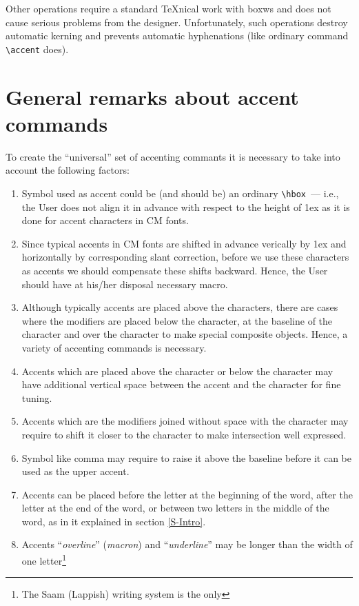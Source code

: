 Other operations require a standard \TeX{}nical work
with boxws and does not cause serious problems
from the designer. Unfortunately, such operations destroy
automatic kerning and prevents automatic hyphenations (like ordinary
command \verb?\accent? does).

\section{General remarks about accent commands\label{S-general}}

To create the ``universal'' set of accenting commants it is necessary
to take into account the following factors:
\begin{enumerate}
\item
Symbol used as accent could be (and should be)
an ordinary \verb?\hbox?~--- i.e., the User does not align it in
advance with respect to the height of \textsf{1ex} as it is done
for accent characters in CM fonts.
\item
Since typical accents in CM fonts
are shifted in advance verically by \textsf{1ex} and horizontally by
corresponding slant correction, before we use these characters
as accents we should compensate these shifts backward. Hence,
the User should have at his/her disposal necessary macro.
\item
Although typically accents are placed above the characters,
there are cases where the modifiers are placed below the character,
at the baseline of the character and over the character to make
special composite objects. Hence, a variety of accenting commands
is necessary.
\item
Accents which are placed above the character or below the character
may have additional vertical space between the accent and the character
for fine tuning.
\item
Accents which are the modifiers joined without
space with the character may require to shift it closer to
the character to make intersection well expressed.
\item
Symbol like comma may require to raise it above the baseline
before it can be used as the upper accent.
\item
Accents can be placed before the letter at the beginning
of the word, after the letter at the end of the word,
or between two letters in the middle of the word,
as in it explained in section \ref{S-Intro}.
\item
Accents ``{\em overline}'' ({\em macron})
and ``{\em underline}'' may be longer than the width
of one letter\footnote{The Saam (Lappish) writing system is the only
}
\end{enumerate}
